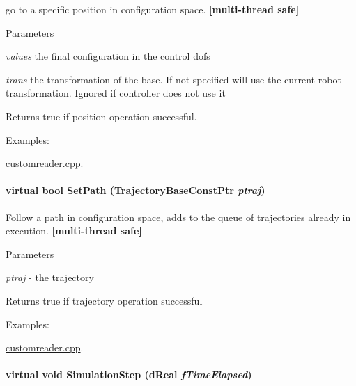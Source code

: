 go to a specific position in configuration space. {\bfseries \mbox{[}multi-\/thread safe\mbox{]}} 


\begin{DoxyParams}{Parameters}
\item[{\em values}]the final configuration in the control dofs \item[{\em trans}]the transformation of the base. If not specified will use the current robot transformation. Ignored if controller does not use it \end{DoxyParams}
\begin{DoxyReturn}{Returns}
true if position operation successful. 
\end{DoxyReturn}
\begin{Desc}
\item[Examples: ]\par
\hyperlink{customreader_8cpp-example}{customreader.cpp}.\end{Desc}
\hypertarget{classOpenRAVE_1_1ControllerBase_aaab0e601177272e3bedb63f0ff5ebf32}{
\paragraph[{SetPath}]{\setlength{\rightskip}{0pt plus 5cm}virtual bool SetPath (TrajectoryBaseConstPtr {\em ptraj})}\hfill}
\label{classOpenRAVE_1_1ControllerBase_aaab0e601177272e3bedb63f0ff5ebf32}


Follow a path in configuration space, adds to the queue of trajectories already in execution. {\bfseries \mbox{[}multi-\/thread safe\mbox{]}} 


\begin{DoxyParams}{Parameters}
\item[{\em ptraj}]-\/ the trajectory \end{DoxyParams}
\begin{DoxyReturn}{Returns}
true if trajectory operation successful 
\end{DoxyReturn}
\begin{Desc}
\item[Examples: ]\par
\hyperlink{customreader_8cpp-example}{customreader.cpp}.\end{Desc}
\hypertarget{classOpenRAVE_1_1ControllerBase_a43163cebf021667f69b0c6b2d357c2fa}{
\paragraph[{SimulationStep}]{\setlength{\rightskip}{0pt plus 5cm}virtual void SimulationStep (dReal {\em fTimeElapsed})}\hfill}
\label{classOpenRAVE_1_1ControllerBase_a43163cebf021667f69b0c6b2d357c2fa}



